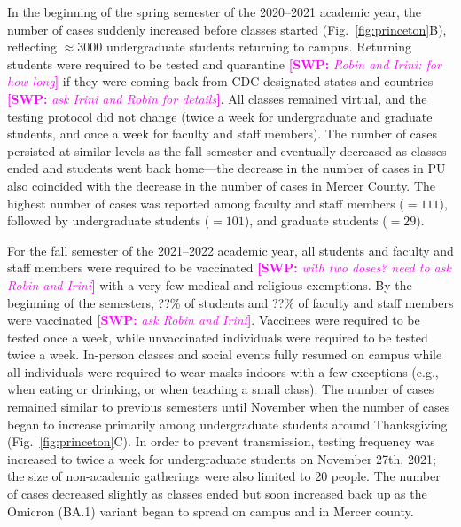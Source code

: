 \documentclass[12pt]{article}
\newcommand{\fref}[1]{Fig.~\ref{fig:#1}}
\newcommand{\comment}[3]{\textcolor{#1}{\textbf{[#2: }\textsl{#3}\textbf{]}}}
\newcommand{\swp}[1]{\comment{magenta}{SWP}{#1}}
\begin{document}
In the beginning of the spring semester of the 2020--2021 academic year, the number of cases suddenly increased before classes started (\fref{princeton}B), reflecting $\approx 3000$ undergraduate students returning to campus.
Returning students were required to be tested and quarantine \swp{Robin and Irini: for how long} if they were coming back from CDC-designated states and countries \swp{ask Irini and Robin for details}.
All classes remained virtual, and the testing protocol did not change (twice a week for undergraduate and graduate students, and once a week for faculty and staff members).
The number of cases persisted at similar levels as the fall semester and eventually decreased as classes ended and students went back home---the decrease in the number of cases in PU also coincided with the decrease in the number of cases in Mercer County.
The highest number of cases was reported among faculty and staff members ($=111$), followed by undergraduate students ($=101$), and graduate students ($=29$).

For the fall semester of the 2021--2022 academic year, all students and faculty and staff members were required to be vaccinated \swp{with two doses? need to ask Robin and Irini} with a very few medical and religious exemptions.
By the beginning of the semesters, ??\% of students and ??\% of faculty and staff members were vaccinated \swp{ask Robin and Irini}.
Vaccinees were required to be tested once a week, while unvaccinated individuals were required to be tested twice a week.
In-person classes and social events fully resumed on campus while all individuals were required to wear masks indoors with a few exceptions (e.g., when eating or drinking, or when teaching a small class).
The number of cases remained similar to previous semesters until November when the number of cases began to increase primarily among undergraduate students around Thanksgiving (\fref{princeton}C).  
In order to prevent transmission, testing frequency was increased to twice a week for undergraduate students on November 27th, 2021; the size of non-academic gatherings were also limited to 20 people.
The number of cases decreased slightly as classes ended but soon increased back up as the Omicron (BA.1) variant began to spread on campus and in Mercer county.
\end{document}

